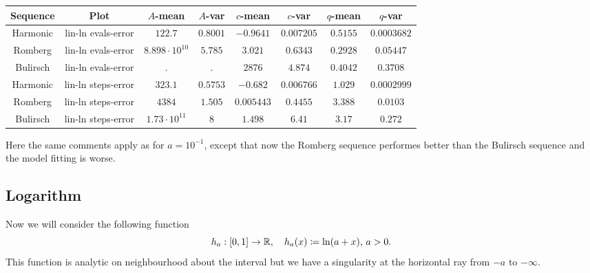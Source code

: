 \begin{table}[H]
    \centering
    \small
    \begin{tabular}{c|c||c|c|c|c|c	|c}
Sequence & Plot & \(A\)-mean & \(A\)-var & \(c\)-mean & \(c\)-var & \(q\)-mean & \(q\)-var\\\hline
\rowcolor{red}
Harmonic & lin-ln evals-error & \(122.7\) & \(0.8001\) & \(-0.9641\) & \(0.007205\) & \(0.5155\) & \(0.0003682\) \\
\rowcolor{red}
Romberg & lin-ln evals-error & \(8.898\cdot 10^{10}\) & \(5.785\) & \(3.021\) & \(0.6343\) & \(0.2928\) & \(0.05447\) \\
\rowcolor{red}
Bulirsch & lin-ln evals-error & \(.\) & \(.\) & \(2876\) & \(4.874\) & \(0.4042\) & \(0.3708\) \\
\rowcolor{red}
Harmonic & lin-ln steps-error & \(323.1\) & \(0.5753\) & \(-0.682\) & \(0.006766\) & \(1.029\) & \(0.0002999\) \\
\rowcolor{yellow}
Romberg & lin-ln steps-error & \(4384\) & \(1.505\) & \(0.005443\) & \(0.4455\) & \(3.388\) & \(0.0103\) \\
\rowcolor{red}
Bulirsch & lin-ln steps-error & \(1.73\cdot 10^{11}\) & \(8\) & \(1.498\) & \(6.41\) & \(3.17\) & \(0.272\) \\
    \end{tabular}
    \label{tab:my_label}
\end{table}

Here the same comments apply as for \(a = 10^{-1}\), except that now the Romberg sequence performes better than the Bulirsch sequence and the model fitting is worse. 

\subsection{Logarithm}

Now we will consider the following function 
\[
h_a: [0, 1] \rightarrow \mathbb{R}, \quad h_a(x) \coloneqq \ln(a + x),\, a > 0.
\]
This function is analytic on neighbourhood about the interval but we have a singularity at the horizontal ray from \(-a\) to \(-\infty\).

